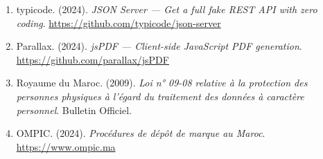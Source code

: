 \documentclass[12pt,a4paper]{report}
\begin{document}
\begin{enumerate}
\item typicode. (2024). \textit{JSON Server — Get a full fake REST API with zero coding}. \url{https://github.com/typicode/json-server}

\item Parallax. (2024). \textit{jsPDF — Client-side JavaScript PDF generation}. \url{https://github.com/parallax/jsPDF}

\item Royaume du Maroc. (2009). \textit{Loi n° 09-08 relative à la protection des personnes physiques à l'égard du traitement des données à caractère personnel}. Bulletin Officiel.

\item OMPIC. (2024). \textit{Procédures de dépôt de marque au Maroc}. \url{https://www.ompic.ma}

\end{enumerate}
\end{document}
